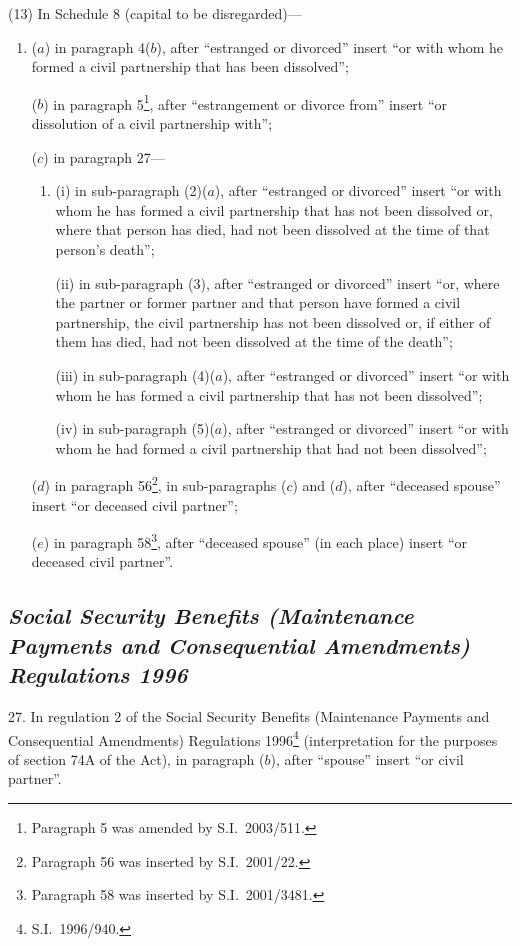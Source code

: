 \documentclass[12pt,a4paper]{article}
\begin{document}
(13) In Schedule 8 (capital to be disregarded)—
\begin{enumerate}\item[]
($a$) in paragraph 4($b$), after “estranged or divorced” insert “or with whom he formed a civil partnership that has been dissolved”;

($b$) in paragraph 5\footnote{Paragraph 5 was amended by S.I.\ 2003/511.}, after “estrangement or divorce from” insert “or dissolution of a civil partnership with”;

($c$) in paragraph 27—
\begin{enumerate}\item[]
(i) in sub-paragraph (2)($a$), after “estranged or divorced” insert “or with whom he has formed a civil partnership that has not been dissolved or, where that person has died, had not been dissolved at the time of that person’s death”;

(ii) in sub-paragraph (3), after “estranged or divorced” insert “or, where the partner or former partner and that person have formed a civil partnership, the civil partnership has not been dissolved or, if either of them has died, had not been dissolved at the time of the death”;

(iii) in sub-paragraph (4)($a$), after “estranged or divorced” insert “or with whom he has formed a civil partnership that has not been dissolved”;

(iv) in sub-paragraph (5)($a$), after “estranged or divorced” insert “or with whom he had formed a civil partnership that had not been dissolved”;
\end{enumerate}

($d$) in paragraph 56\footnote{Paragraph 56 was inserted by S.I.\ 2001/22.}, in sub-paragraphs ($c$)  and ($d$), after “deceased spouse” insert “or deceased civil partner”;

($e$) in paragraph 58\footnote{Paragraph 58 was inserted by S.I.\ 2001/3481.}, after “deceased spouse” (in each place) insert “or deceased civil partner”.
\end{enumerate}

\subsection*{\itshape Social Security Benefits (Maintenance Payments and Consequential Amendments) Regulations 1996}

27.  In regulation 2 of the Social Security Benefits (Maintenance Payments and Consequential Amendments) Regulations 1996\footnote{S.I.\ 1996/940.} (interpretation for the purposes of section 74A of the Act), in paragraph ($b$), after “spouse” insert “or civil partner”.
\end{document}
